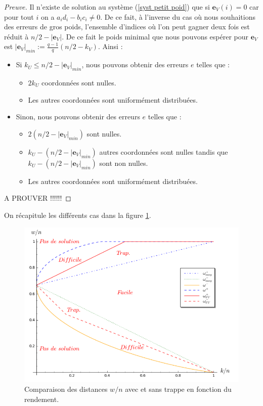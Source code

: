 \documentclass[12pt]{article}
\theoremstyle{plain}
\newcommand{\e}{\mathbf{e}}
\begin{document}
\begin{proof}[Preuve]
Il n'existe de solution au système (\ref{syst petit poid}) que si $\e_V(i)=0$ car pour tout $i$ on a $a_id_i -b_ic_i \neq 0$. De ce fait, à l'inverse du cas où nous souhaitions des erreurs de gros poids, l'ensemble d'indices où l'on peut gagner deux fois est réduit à $n/2 - |\e_V|$. De ce fait le poids minimal que nous pouvons espérer pour $\e_V$ est $|\e_V|_{min} := \frac{q-1}{q}(n/2-k_V)$. Ainsi :
\begin{itemize}
\item Si $k_U \leq n/2 - |\e_V|_{min}$, nous pouvons obtenir des erreurs $e$ telles que :
	\begin{itemize}
	\item $2k_U$ coordonnées sont nulles.
	\item Les autres coordonnées sont uniformément distribuées.
	\end{itemize}
\item Sinon, nous pouvons obtenir des erreurs $e$ telles que :
	\begin{itemize}
	\item $2(n/2 - |\e_V|_{min})$ sont nulles.
	\item $k_U - (n/2 - |\e_V|_{min})$ autres coordonnées sont nulles tandis que $k_U - (n/2 - |\e_V|_{min})$ sont non nulles.
	\item Les autres coordonnées sont uniformément distribuées.
	\end{itemize}
\end{itemize} 
A PROUVER !!!!!!
\end{proof}

On récapitule les différents cas dans la figure \ref{graphique ratio}. \\

\begin{figure}[h]
\label{graphique ratio}
\begin{center}
\includegraphics [scale=0.4]{graph_ratio_w.png}
\end{center}
\caption{\small Comparaison des distances $w/n$ avec et sans trappe en fonction du rendement.}
\end{figure}
\end{document}
